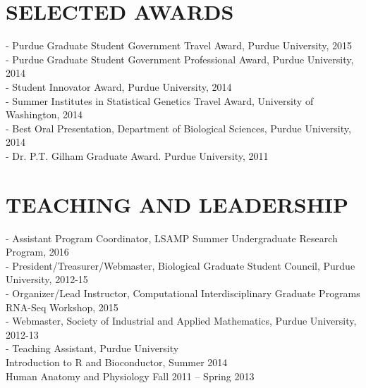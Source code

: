 \documentclass[11pt,letterpaper,sans]{moderncv}        %
\begin{document}
{\section{SELECTED AWARDS}
\begin{minipage}{\maincolumnwidth}%
	\small{
	- Purdue Graduate Student Government Travel Award, Purdue University, 2015\\
          - Purdue Graduate Student Government Professional Award, Purdue University, 2014\\
          - Student Innovator Award, Purdue University, 2014\\
          - Summer Institutes in Statistical Genetics Travel Award, University of Washington, 2014\\
	- Best Oral Presentation, Department of Biological Sciences, Purdue University, 2014\\
	 - Dr. P.T. Gilham Graduate Award. Purdue University, 2011
	}%
\end{minipage}%
 
\section{TEACHING AND LEADERSHIP}
\begin{minipage}{\maincolumnwidth}%
	\small{
          - Assistant Program Coordinator, LSAMP Summer Undergraduate Research Program, 2016\\
          - President/Treasurer/Webmaster, Biological Graduate Student Council, Purdue University, 2012-15\\
          - Organizer/Lead Instructor, Computational Interdisciplinary Graduate Programs RNA-Seq Workshop, 2015\\
          - Webmaster, Society of Industrial and Applied Mathematics, Purdue University, 2012-13\\
	- Teaching Assistant, Purdue University\\
		\tab \quad  \bullet Introduction to R and Bioconductor, Summer 2014\\ 
		\tab \quad \bullet  Human Anatomy and Physiology Fall 2011 – Spring 2013
	}%
\end{minipage}%

}
\nocite{*}

\end{document}
